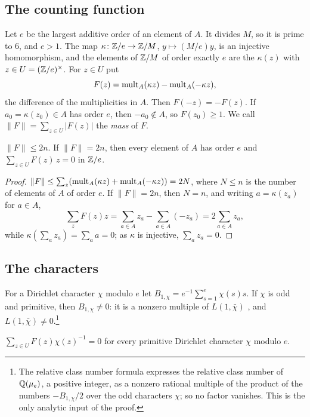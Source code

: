 \subsection{The counting function}
Let $e$ be the largest additive order of an element of $A$. It divides $M$,
so it is prime to $6$, and $e>1$. The map $\kappa\colon\mathbb{Z}/e\to\mathbb{Z}/M$,
$y\mapsto(M/e)y$, is an injective homomorphism, and the elements of $\mathbb{Z}/M$
of order exactly $e$ are the $\kappa(z)$ with $z\in U=(\mathbb{Z}/e)^{\times}$. For
$z\in U$ put
\[
  F(z)=\operatorname{mult}_{A}(\kappa z)-\operatorname{mult}_{A}(-\kappa z),
\]
the difference of the multiplicities in $A$. Then $F(-z)=-F(z)$. If
$a_{0}=\kappa(z_{0})\in A$ has order $e$, then $-a_{0}\notin A$, so
$F(z_{0})\ge1$. We call $\|F\|=\sum_{z\in U}|F(z)|$ the \emph{mass} of $F$.

\begin{lemma}\label{lem:countF}
$\|F\|\le2n$. If $\|F\|=2n$, then every element of $A$ has order $e$ and
$\sum_{z\in U}F(z)\,z=0$ in $\mathbb{Z}/e$.
\end{lemma}

\begin{proof}
$\|F\|\le\sum_{z}(\operatorname{mult}_{A}(\kappa z)+\operatorname{mult}_{A}(-\kappa z))=2N$, where
$N\le n$ is the number of elements of $A$ of order $e$. If $\|F\|=2n$, then
$N=n$, and writing $a=\kappa(z_{a})$ for $a\in A$,
\[
  \sum_{z}F(z)z=\sum_{a\in A}z_{a}-\sum_{a\in A}(-z_{a})=2\sum_{a\in
  A}z_{a},
\]
while $\kappa(\sum_{a}z_{a})=\sum_{a}a=0$; as $\kappa$ is injective,
$\sum_{a}z_{a}=0$.
\end{proof}

\subsection{The characters}
For a Dirichlet character $\chi$ modulo $e$ let $B_{1,\chi}=e^{-1}\sum_{s=1}
^{e}\chi(s)s$. If $\chi$ is odd and primitive, then $B_{1,\chi}\ne0$: it is a
nonzero multiple of $L(1,\bar\chi)$ \cite[Theorem~4.9]{Was97}, and
$L(1,\bar\chi)\ne0$.\footnote{The relative class number formula
\cite[Theorem~4.17]{Was97} expresses the relative class number of
$\mathbb{Q}(\mu_{e})$, a positive integer, as a nonzero rational multiple of the
product of the numbers $-B_{1,\chi}/2$ over the odd characters $\chi$; so no
factor vanishes. This is the only analytic input of the proof.}

\begin{lemma}\label{lem:charstep}
$\sum_{z\in U}F(z)\chi(z)^{-1}=0$ for every primitive Dirichlet character
$\chi$ modulo $e$.
\end{lemma}

